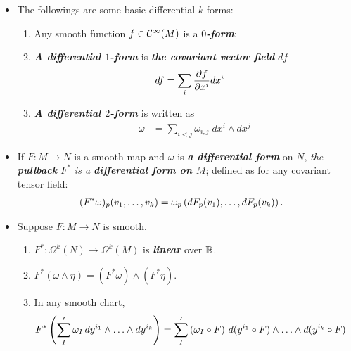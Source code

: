 \documentclass[11pt]{article}
\begin{document}
\begin{itemize}
\item \begin{example} The followings are some basic differential $k$-forms:
\begin{enumerate}
\item Any smooth function $f \in {\mathcal C}^{\infty}(M)$ is a \emph{\textbf{$0$-form}};
\item \emph{\textbf{A differential $1$-form}} is \emph{\textbf{the covariant vector field}} $df$
\begin{align*}
df &= \sum_{i}\frac{\partial f}{ \partial x^{i}}dx^{i}
\end{align*}
\item \emph{\textbf{A differential $2$-form}}  is written as
\begin{align*}
\omega &= \sum_{i < j}\omega_{i,j}\; dx^{i} \wedge dx^j
\end{align*}
\end{enumerate}
\end{example}

\item \begin{definition}
If $F: M \rightarrow N$ is a smooth map and $\omega$ is \emph{\textbf{a differential form}} on $N$, \emph{the \textbf{pullback} $F^{*}$ is a \textbf{differential form on $M$}}; defined as for any covariant tensor field:
\begin{align*}
(F^{*}\omega)_p(v_1, \ldots, v_k) &= \omega_p\left(dF_p(v_1), \ldots, dF_p(v_k)\right).
\end{align*}
\end{definition}

\item \begin{lemma}
Suppose $F: M \rightarrow N$ is smooth.
\begin{enumerate}
\item $F^{*}: \Omega^k(N) \rightarrow \Omega^k(M)$ is \emph{\textbf{linear}} over ${\mathbb R}$.
\item $F^{*}(\omega \wedge \eta) = (F^{*}\omega) \wedge (F^{*}\eta)$.
\item  In any smooth chart,
\begin{align}
F^{*}\left(\sum_{I}'\omega_{I}\,dy^{i_1} \wedge \ldots \wedge dy^{i_k}\right) &= \sum_{I}'\left(\omega_I \circ F\right)\,d(y^{i_1} \circ F) \wedge \ldots \wedge d(y^{i_k} \circ F) \label{eqn: differential_form_pull_back_coordinate_0}
\end{align}
\end{enumerate}
\end{lemma}




\end{itemize}
\end{document}

